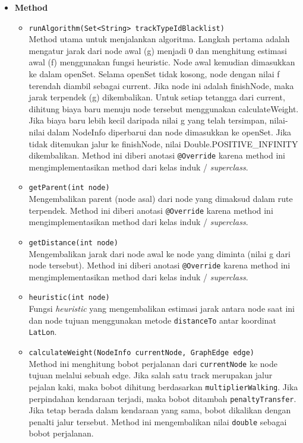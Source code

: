\begin{itemize}
    \item \textbf{Method}
    \begin{itemize}
        \item \texttt{runAlgorithm(Set<String> trackTypeIdBlacklist)}
        \\ Method utama untuk menjalankan algoritma. Langkah pertama adalah mengatur jarak dari node awal (g) menjadi 0 dan menghitung estimasi awal (f) menggunakan fungsi heuristic. Node awal kemudian dimasukkan ke dalam openSet. Selama openSet tidak kosong, node dengan nilai f terendah diambil sebagai current. Jika node ini adalah finishNode, maka jarak terpendek (g) dikembalikan. Untuk setiap tetangga dari current, dihitung biaya baru menuju node tersebut menggunakan calculateWeight. Jika biaya baru lebih kecil daripada nilai g yang telah tersimpan, nilai-nilai dalam NodeInfo diperbarui dan node dimasukkan ke openSet. Jika tidak ditemukan jalur ke finishNode, nilai Double.POSITIVE\_INFINITY dikembalikan. Method ini diberi anotasi \texttt{@Override} karena method ini mengimplementasikan method dari kelas induk / \textit{superclass}.

        \item \texttt{getParent(int node)}
        \\ Mengembalikan parent (node asal) dari node yang dimaksud dalam rute terpendek. Method ini diberi anotasi \texttt{@Override} karena method ini mengimplementasikan method dari kelas induk / \textit{superclass}.

        \item \texttt{getDistance(int node)}
        \\ Mengembalikan jarak dari node awal ke node yang diminta (nilai g dari node tersebut). Method ini diberi anotasi \texttt{@Override} karena method ini mengimplementasikan method dari kelas induk / \textit{superclass}.

        \item \texttt{heuristic(int node)}
        \\ Fungsi \textit{heuristic} yang mengembalikan estimasi jarak antara node saat ini dan node tujuan menggunakan metode \texttt{distanceTo} antar koordinat \texttt{LatLon}.

        \item \texttt{calculateWeight(NodeInfo currentNode, GraphEdge edge)}
        \\ Method ini menghitung bobot perjalanan dari \texttt{currentNode} ke node tujuan melalui sebuah edge. Jika salah satu track merupakan jalur pejalan kaki, maka bobot dihitung berdasarkan \texttt{multiplierWalking}. Jika perpindahan kendaraan terjadi, maka bobot ditambah \texttt{penaltyTransfer}. Jika tetap berada dalam kendaraan yang sama, bobot dikalikan dengan penalti jalur tersebut. Method ini mengembalikan nilai \texttt{double} sebagai bobot perjalanan.
    \end{itemize}
\end{itemize}
\newpage
